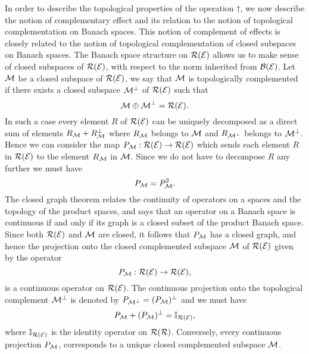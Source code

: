 \documentclass[11pt]{article}
\begin{document}
In order to describe the topological properties of the operation $\dagger$, we now describe the notion of complementary effect and its relation to the notion of topological complementation on Banach spaces. This notion of complement of effects is closely related to the notion of topological complementation of closed subspaces on Banach spaces. The Banach space structure on $\mathcal{R}(\mathcal{E})$ allows us to make sense of closed subspaces of $\mathcal{R}(\mathcal{E})$, with respect to the norm inherited from $\mathcal{B}(\mathcal{E})$. Let $\mathcal{M}$ be a closed subspace of $\mathcal{R}(\mathcal{E})$, we say that $\mathcal{M}$ is topologically complemented if there exists a closed subspace $\mathcal{M}^\perp$ of $\mathcal{R}(\mathcal{E})$ such that
$$\mathcal{M}\oplus \mathcal{M}^\perp = \mathcal{R}(\mathcal{E}).$$
In such a case every element $R$ of $\mathcal{R}(\mathcal{E})$ can be uniquely decomposed as a direct sum of elements $R_{\mathcal{M}}+R_{\mathcal{M}}^\perp$ where $R_{\mathcal{M}}$ belongs to $\mathcal{M}$ and $R_{\mathcal{M}^\perp}$ belongs to $\mathcal{M}^\perp$. Hence we can consider the map $P_{\mathcal{M}}:\mathcal{R}(\mathcal{E})\to \mathcal{R}(\mathcal{E})$ which sends each element $R$ in $\mathcal{R}(\mathcal{E})$ to the element $R_{\mathcal{M}}$ in $\mathcal{M}$. Since we do not have to decompose $R$ any further we must have
$$P_{\mathcal{M}}=P_{\mathcal{M}}^2.$$
The closed graph theorem relates the continuity of operators on a spaces and the topology of the product spaces, and says that an operator on a Banach space is continuous if and only if its graph is a closed subset of the product Banach space. Since both $\mathcal{R}(\mathcal{E})$ and $\mathcal{M}$ are closed, it follows that $P_{\mathcal{M}}$ has a closed graph, and hence the projection onto the closed complemented subspace $\mathcal{M}$ of $\mathcal{R}(\mathcal{E})$ given by the operator
$$P_{\mathcal{M}}:\mathcal{R}(\mathcal{E})\to \mathcal{R}(\mathcal{E}),$$
is a continuous operator on $\mathcal{R}(\mathcal{E})$. The continuous projection onto the topological complement $\mathcal{M}^\perp$ is denoted by $P_{\mathcal{M}^\perp}=(P_{\mathcal{M}})^\perp$ and we must have
\[P_{\mathcal{M}}+ (P_{\mathcal{M}})^\perp=\mathbb{I}_{\mathcal{R}(\mathcal{E})},\]
where $\mathbb{I}_{\mathcal{R}(\mathcal{E})}$ is the identity operator on $\mathcal{R}(\mathcal{R})$. Conversely, every continuous projection $P_{\mathcal{M}}$, corresponds to a unique closed complemented subspace $\mathcal{M}$. 
\end{document}
